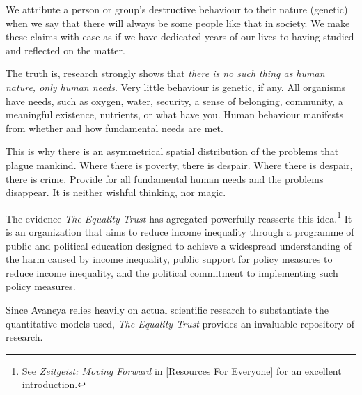 

We attribute a person or group's destructive behaviour to their nature (genetic) when we say that there will always be some people like that in society. We make these claims with ease as if we have dedicated years of our lives to having studied and reflected on the matter.

The truth is, research strongly shows that {\it there is no such thing as human nature, only human needs}. Very little behaviour is genetic, if any. All organisms have needs, such as oxygen, water, security, a sense of belonging, community, a meaningful existence, nutrients, or what have you. Human behaviour manifests from whether and how fundamental needs are met.

This is why there is an asymmetrical spatial distribution of the problems that plague mankind. Where there is poverty, there is despair. Where there is despair, there is crime. Provide for all fundamental human needs and the problems disappear. It is neither wishful thinking, nor magic.

The evidence {\it The Equality Trust} has agregated powerfully reasserts this idea.\footnote{See {\it Zeitgeist: Moving Forward} in [Resources For Everyone] for an excellent introduction.} It is an organization that aims to reduce income inequality through a programme of public and political education designed to achieve a widespread understanding of the harm caused by income inequality, public support for policy measures to reduce income inequality, and the political commitment to implementing such policy measures. 

Since Avaneya relies heavily on actual scientific research to substantiate the quantitative models used, {\it The Equality Trust} provides an invaluable repository of research.



